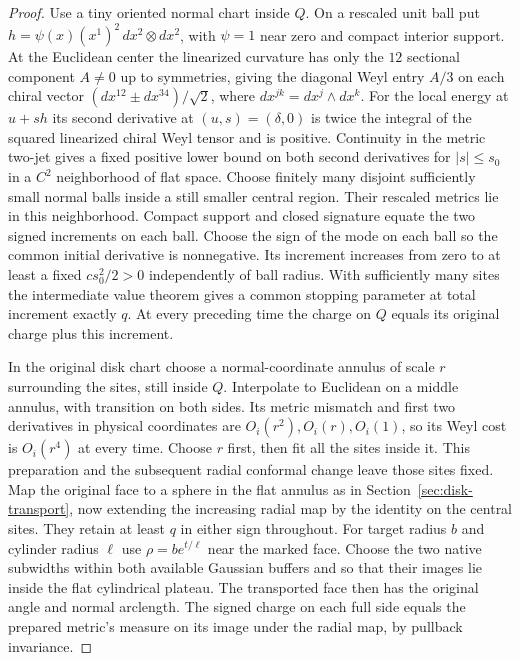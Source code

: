 \documentclass[11pt,letterpaper]{article}
\numberwithin{equation}{section}
\begin{document}
\begin{proof}
Use a tiny oriented normal chart inside \(Q\). On a rescaled unit
ball put \(h=\psi(x)(x^1)^2\,dx^2\otimes dx^2\), with \(\psi=1\)
near zero and compact interior support. At the Euclidean center the
linearized curvature has only the \(12\) sectional component \(A\ne0\)
up to symmetries, giving the diagonal Weyl entry \(A/3\) on each
chiral vector \((dx^{12}\pm dx^{34})/\sqrt2\), where
\(dx^{jk}=dx^j\wedge dx^k\).
For the local energy at \(u+s h\) its second derivative at
\((u,s)=(\delta,0)\) is twice the integral of the squared linearized
chiral Weyl tensor and is positive. Continuity in the metric two-jet
gives a fixed positive lower bound on both second derivatives for
\(|s|\le s_0\) in a \(C^2\) neighborhood of flat space.
Choose finitely many disjoint sufficiently small normal balls
inside a still smaller central region. Their rescaled metrics lie in
this neighborhood. Compact support and closed signature equate the
two signed increments on each ball. Choose the sign of the mode
on each ball so the common initial derivative is nonnegative.
Its increment increases from zero to at least a fixed
\(c s_0^2/2>0\) independently of ball radius. With sufficiently
many sites the intermediate value theorem gives a common stopping
parameter at total increment exactly \(q\). At every preceding time
the charge on \(Q\) equals its original charge plus this increment.

In the original disk chart choose a normal-coordinate annulus of
scale \(r\) surrounding the sites, still inside \(Q\).
Interpolate to Euclidean on a middle annulus, with transition on
both sides. Its metric mismatch and first two derivatives in
physical coordinates are \(O_i(r^2),O_i(r),O_i(1)\), so its Weyl
cost is \(O_i(r^4)\) at every time. Choose \(r\) first, then fit all
the sites inside it. This preparation and the subsequent radial
conformal change leave those sites fixed. Map the original face to
a sphere in the flat annulus as in Section~\ref{sec:disk-transport},
now extending the increasing radial map by the identity on the
central sites. They retain at least \(q\) in either sign throughout.
For target radius \(b\) and cylinder radius \(\ell\) use
\(\rho=b e^{t/\ell}\) near the marked face. Choose the two native
subwidths within both available Gaussian buffers and so that their
images lie inside the flat cylindrical plateau. The transported
face then has the original angle and normal arclength. The signed charge on each full
side equals the prepared metric's measure on its image under the
radial map, by pullback invariance.


\end{proof}
\end{document}
